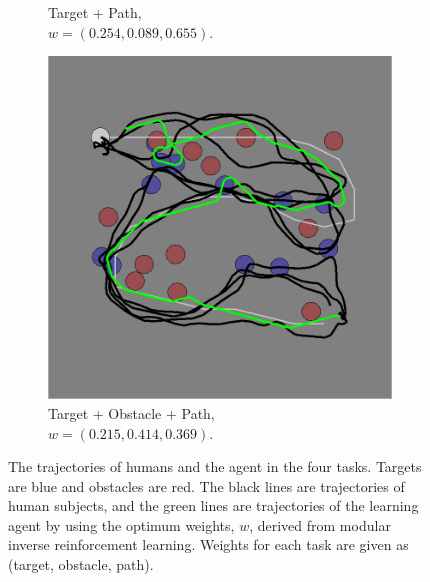 \begin{figure}[h]
\begin{subfigure}[b]{0.24\textwidth}
\caption{Target + Path, \\$w = (0.254, 0.089, 0.655)$. }
\end{subfigure}
\begin{subfigure}[b]{0.24\textwidth}
\includegraphics[width=\textwidth]{task_4.png}
\caption{Target + Obstacle + Path, \\$w = (0.215, 0.414, 0.369)$. }
\end{subfigure}
\caption{The trajectories of humans and the agent in the four tasks. Targets are blue and obstacles are red. The
black lines are trajectories of human subjects, and the green lines are
trajectories of the learning agent by using the optimum weights, $w$, derived
from modular inverse reinforcement learning. Weights for each task are given as (target,
obstacle, path).}

\label{fig:exp}
\end{figure}


